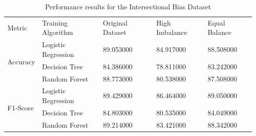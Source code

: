 \begin{table}[p]
\caption{Performance results for the Intersectional Bias Dataset}
\begin{tabular}{lllll}
Metric & Training Algorithm & Original Dataset & High Imbalance & Equal Balance \\
\multirow[c]{3}{*}{Accuracy} & Logistic Regression & 89.053000 & 84.917000 & 88.508000 \\
 & Decision Tree & 84.386000 & 78.811000 & 83.242000 \\
 & Random Forest & 88.773000 & 80.538000 & 87.508000 \\
\multirow[c]{3}{*}{F1-Score} & Logistic Regression & 89.429000 & 86.464000 & 89.050000 \\
 & Decision Tree & 84.803000 & 80.535000 & 84.049000 \\
 & Random Forest & 89.214000 & 83.421000 & 88.342000 \\
\end{tabular}
\end{table}
